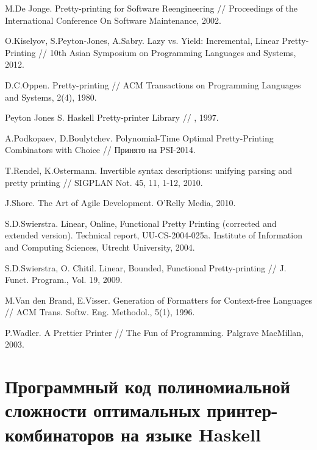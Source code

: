 \begin{thebibliography}{9001}
 M.De Jonge. Pretty-printing for Software Reengineering // Proceedings of the International Conference On Software Maintenance, 2002.

 O.Kiselyov, S.Peyton-Jones, A.Sabry. Lazy vs. Yield: Incremental, Linear Pretty-Printing // 10th Asian Symposium on Programming Languages and Systems, 
2012.

 D.C.Oppen. Pretty-printing // ACM Transactions on Programming Languages and Systems, 2(4), 1980.

 Peyton Jones S. Haskell Pretty-printer Library // , 1997.

 A.Podkopaev, D.Boulytchev.
Polynomial-Time Optimal Pretty-Printing Combinators with Choice // Принято на PSI-2014. 

 T.Rendel, K.Ostermann. Invertible syntax descriptions: unifying parsing and pretty printing // SIGPLAN Not. 45, 11, 1-12, 2010.

 J.Shore. The Art of Agile Development. O'Relly Media, 2010.

 S.D.Swierstra. Linear, Online, Functional Pretty Printing (corrected and extended version).
Technical report, UU-CS-2004-025a. Institute of Information and Computing Sciences, Utrecht University, 2004.

 S.D.Swierstra, O. Chitil. Linear, Bounded, Functional Pretty-printing // J. Funct. Program., Vol. 19,
2009.

 M.Van den Brand, E.Visser. Generation of Formatters for Context-free Languages // ACM Trans. Softw. Eng. Methodol., 5(1), 1996.

 P.Wadler. A Prettier Printer // The Fun of Programming. Palgrave MacMillan, 2003.


\end{thebibliography}

\section*{Программный код полиномиальной сложности оптимальных принтер-комбинаторов на языке Haskell}
\label{app:1}


